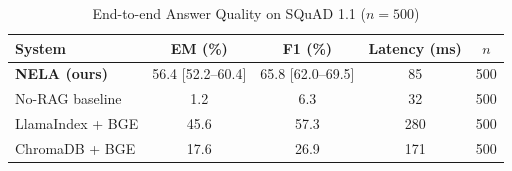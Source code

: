 \begin{table}[t]
\centering
\caption{End-to-end Answer Quality on SQuAD 1.1 ($n=500$)}
\label{tab:e2e}
\begin{tabular}{lcccc}
\toprule
System & EM (\%) & F1 (\%) & Latency (ms) & $n$ \\
\midrule
\textbf{NELA (ours)} & 56.4 [52.2--60.4] & 65.8 [62.0--69.5] & 85 & 500 \\
No-RAG baseline & 1.2 & 6.3 & 32 & 500 \\
LlamaIndex + BGE & 45.6 & 57.3 & 280 & 500 \\
ChromaDB + BGE & 17.6 & 26.9 & 171 & 500 \\
\bottomrule
\end{tabular}
\end{table}